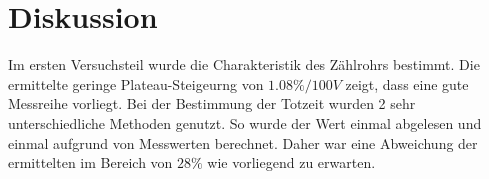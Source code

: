\section{Diskussion}
\label{sec:Diskussion}
Im ersten Versuchsteil wurde die Charakteristik des Zählrohrs bestimmt. Die ermittelte
geringe Plateau-Steigeurng von $1.08\%/100𝑉$ zeigt, dass eine gute Messreihe vorliegt. Bei
der Bestimmung der Totzeit wurden 2 sehr unterschiedliche Methoden genutzt. So wurde
der Wert einmal abgelesen und einmal aufgrund von Messwerten berechnet. Daher war
eine Abweichung der ermittelten im Bereich von $28\%$ wie vorliegend zu erwarten.